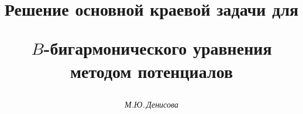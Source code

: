 

 


% 


\newcommand{\tts}[1]{} 


 




\setcounter{page}{79} 












 


\author{\it М.Ю.\,Денисова} 




\title{Решение основной краевой задачи для  


$B$-бигармонического уравнения методом потенциалов} 


 


\date{} 




\pagestyle{plain} %


 




\maketitle 


\label{begin} 


 


